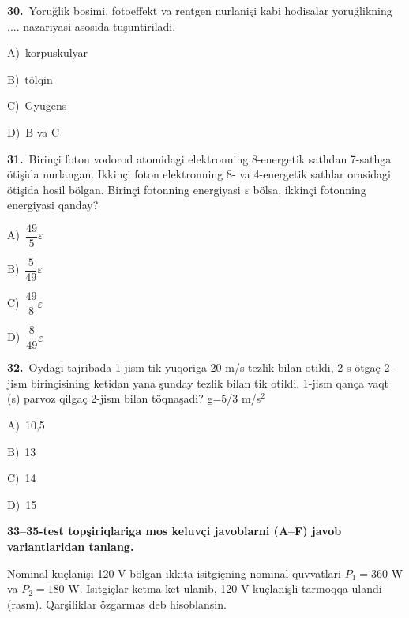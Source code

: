\documentclass[11pt,a4paper]{article}
\newcommand{\opt}[2]{\hspace*{4mm}#1)\ #2\par}
\begin{document}
\noindent\begin{minipage}{\linewidth}
\textbf{30.}\ Yoruğlik bosimi, fotoeffekt va rentgen nurlanişi kabi hodisalar yoruğlikning .... nazariyasi asosida tuşuntiriladi.\par\smallskip
\opt{A}{korpuskulyar}
\opt{B}{tölqin}
\opt{C}{Gyugens}
\opt{D}{B va C}
\end{minipage}\vspace{9pt}\par
\noindent\begin{minipage}{\linewidth}
\textbf{31.}\ Birinçi foton vodorod atomidagi elektronning 8-energetik sathdan 7-sathga ötişida nurlangan. Ikkinçi foton elektronning 8- va 4-energetik sathlar orasidagi ötişida hosil bölgan. Birinçi fotonning energiyasi $\varepsilon$ bölsa, ikkinçi fotonning energiyasi qanday?\par\smallskip
\opt{A}{$\dfrac{49}{5}\varepsilon$}
\opt{B}{$\dfrac{5}{49}\varepsilon$}
\opt{C}{$\dfrac{49}{8}\varepsilon$}
\opt{D}{$\dfrac{8}{49}\varepsilon$}
\end{minipage}\vspace{9pt}\par
\noindent\begin{minipage}{\linewidth}
\textbf{32.}\ Oydagi tajribada 1-jism tik yuqoriga 20 m/s tezlik bilan otildi, 2 s ötgaç 2-jism birinçisining ketidan yana şunday tezlik bilan tik otildi. 1-jism qança vaqt (s) parvoz qilgaç 2-jism bilan töqnaşadi? g=5/3 m/s$^{2}$\par\smallskip
\opt{A}{10,5}
\opt{B}{13}
\opt{C}{14}
\opt{D}{15}
\end{minipage}\vspace{9pt}\par
\newpage\noindent\textbf{33–35-test topşiriqlariga mos keluvçi javoblarni (A–F) javob variantlaridan tanlang.}\par\smallskip
Nominal kuçlanişi 120 V bölgan ikkita isitgiçning nominal quvvatlari $P_1=360$ W va $P_2=180$ W. Isitgiçlar ketma-ket ulanib, 120 V kuçlanişli tarmoqqa ulandi (rasm). Qarşiliklar özgarmas deb hisoblansin.\par\medskip
\begin{center}\end{center}
\end{document}
